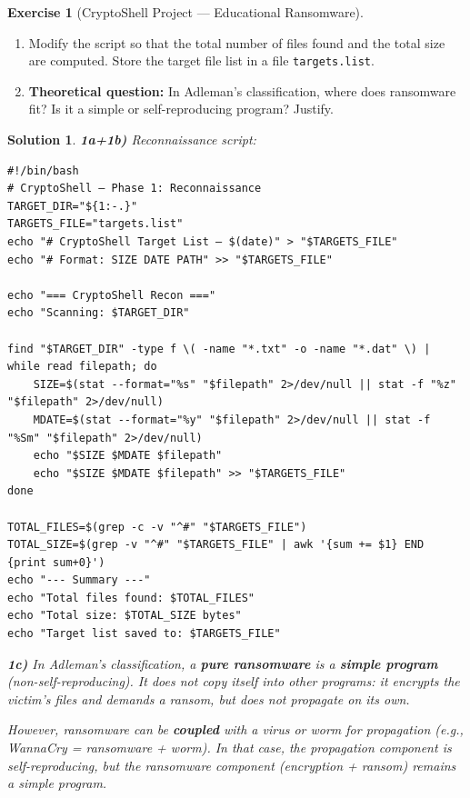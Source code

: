 \documentclass[a4paper,11pt]{article}
\theoremstyle{plain}
\newtheorem{correction}{Solution}
\theoremstyle{definition}
\newtheorem{exercice}{Exercise}
\begin{document}
\begin{exercice}[CryptoShell Project --- Educational Ransomware]
\begin{enumerate}
\item[\textbf{1b)}] Modify the script so that the total number of files found and the total size are computed. Store the target file list in a file \texttt{targets.list}.

\item[\textbf{1c)}] \textbf{Theoretical question:} In Adleman's classification, where does ransomware fit? Is it a simple or self-reproducing program? Justify.
\end{enumerate}

\begin{correction}

\textbf{1a+1b)} Reconnaissance script:
\begin{lstlisting}[title=recon.sh (phase1\_recon.sh)]
#!/bin/bash
# CryptoShell — Phase 1: Reconnaissance
TARGET_DIR="${1:-.}"
TARGETS_FILE="targets.list"
echo "# CryptoShell Target List — $(date)" > "$TARGETS_FILE"
echo "# Format: SIZE DATE PATH" >> "$TARGETS_FILE"

echo "=== CryptoShell Recon ==="
echo "Scanning: $TARGET_DIR"

find "$TARGET_DIR" -type f \( -name "*.txt" -o -name "*.dat" \) | while read filepath; do
    SIZE=$(stat --format="%s" "$filepath" 2>/dev/null || stat -f "%z" "$filepath" 2>/dev/null)
    MDATE=$(stat --format="%y" "$filepath" 2>/dev/null || stat -f "%Sm" "$filepath" 2>/dev/null)
    echo "$SIZE $MDATE $filepath"
    echo "$SIZE $MDATE $filepath" >> "$TARGETS_FILE"
done

TOTAL_FILES=$(grep -c -v "^#" "$TARGETS_FILE")
TOTAL_SIZE=$(grep -v "^#" "$TARGETS_FILE" | awk '{sum += $1} END {print sum+0}')
echo "--- Summary ---"
echo "Total files found: $TOTAL_FILES"
echo "Total size: $TOTAL_SIZE bytes"
echo "Target list saved to: $TARGETS_FILE"
\end{lstlisting}

\textbf{1c)} In Adleman's classification, a \textbf{pure ransomware} is a \textbf{simple program} (non-self-reproducing). It does not copy itself into other programs: it encrypts the victim's files and demands a ransom, but does not propagate on its own.

However, ransomware can be \textbf{coupled} with a virus or worm for propagation (e.g., WannaCry = ransomware + worm). In that case, the propagation component is self-reproducing, but the ransomware component (encryption + ransom) remains a simple program.


\end{correction}
\end{exercice}
\end{document}
